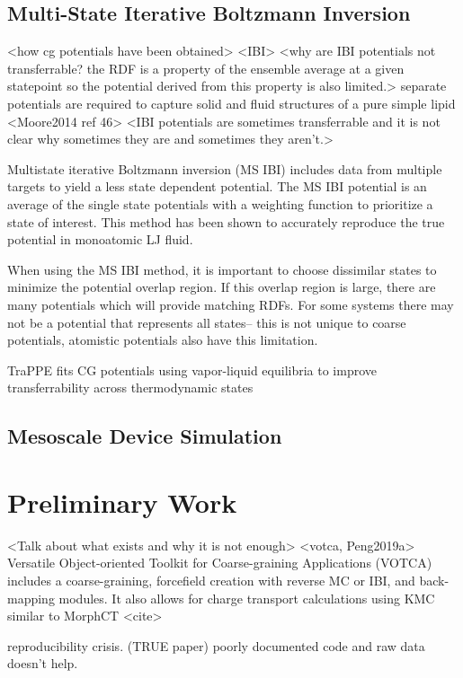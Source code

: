 \subsection*{Multi-State Iterative Boltzmann Inversion}
<how cg potentials have been obtained>
<IBI>
<why are IBI potentials not transferrable? the RDF is a property of the ensemble average at a given statepoint so the potential derived from this property is also limited.>
separate potentials are required to capture solid and fluid structures of a pure simple lipid <Moore2014 ref 46>
<IBI potentials are sometimes transferrable and it is not clear why sometimes they are and sometimes they aren't.> \cite{Moore2014}

Multistate iterative Boltzmann inversion (MS IBI) includes data from multiple targets to yield a less state dependent potential.
\cite{Moore2014}
The MS IBI potential is an average of the single state potentials with a weighting function to prioritize a state of interest.
This method has been shown to accurately reproduce the true potential in monoatomic LJ fluid.

When using the MS IBI method, it is important to choose dissimilar states to minimize the potential overlap region.
If this overlap region is large, there are many potentials which will provide matching RDFs.
For some systems there may not be a potential that represents all states-- this is not unique to coarse potentials, atomistic potentials also have this limitation.

TraPPE fits CG potentials using vapor-liquid equilibria to improve transferrability across thermodynamic states\cite{Maerzke2011}

\subsection*{Mesoscale Device Simulation}

\section*{Preliminary Work}
<Talk about what exists and why it is not enough>
<votca, Peng2019a> 
Versatile Object-oriented Toolkit for Coarse-graining Applications (VOTCA) \cite{Ruhle2011b}
includes a coarse-graining, forcefield creation with reverse MC or IBI, and back-mapping modules.
It also allows for charge transport calculations using KMC similar to MorphCT <cite>

reproducibility crisis.\cite{Cummings2019} \cite{Thompson2020} (TRUE paper) poorly documented code and raw data doesn't help.

